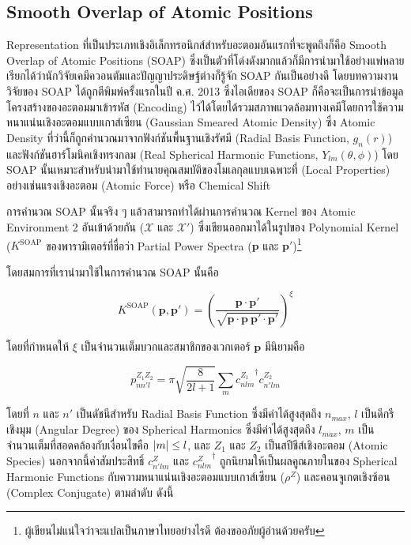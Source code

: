 \subsection{Smooth Overlap of Atomic Positions}
\label{ssec:soap}

Representation ที่เป็นประเภทเชิงอิเล็กทรอนิกส์สำหรับอะตอมอันแรกที่จะพูดถึงก็คือ Smooth Overlap of Atomic Positions (SOAP) 
ซึ่งเป็นตัวที่โด่งดังมากแล้วก็มีการนำมาใช้อย่างแพ่หลาย เรียกได้ว่านักวิจัยเคมีควอนตัมและปัญญาประดิษฐ์ต่างก็รู้จัก SOAP กันเป็นอย่างดี
โดยบทความงานวิจัยของ SOAP ได้ถูกตีพิมพ์ครั้งแรกในปี ค.ศ. 2013 ซึ่งไอเดียของ SOAP ก็คือจะเป็นการนำข้อมูลโครงสร้างของอะตอมมาเข้ารหัส 
(Encoding) ไว้ได้โดยได้รวมสภาพแวดล้อมทางเคมีโดยการใช้ความหนาแน่นเชิงอะตอมแบบเกาส์เซียน (Gaussian Smeared Atomic Density) 
ซึ่ง Atomic Density ที่ว่านี้ก็ถูกคำนวณมาจากฟังก์ชันพื้นฐานเชิงรัศมี (Radial Basis Function, $g_{n}(r)$) และฟังก์ชันฮาร์โมนิคเชิงทรงกลม 
(Real Spherical Harmonic Functions, $Y_{lm}(\theta, \phi)$)\autocite{bartok2013,de2016}
โดย SOAP นั้นเหมาะสำหรับนำมาใช้ทำนายคุณสมบัติของโมเลกุลแบบเฉพาะที่ (Local Properties) อย่างเช่นแรงเชิงอะตอม (Atomic Force) 
หรือ Chemical Shift

การคำนวณ SOAP นั้นจริง ๆ แล้วสามารถทำได้ผ่านการคำนวณ Kernel ของ Atomic Environment 2 อันเข้าด้วยกัน ($\mathcal{X}$ และ 
$\mathcal{X}'$) ซึ่งเขียนออกมาได้ในรูปของ Polynomial Kernel ($K^\mathrm{SOAP}$ ของพารามิเตอร์ที่ชื่อว่า Partial Power 
Spectra ($\mathbf{p}$ และ $\mathbf{p}'$)\footnote{ผู้เขียนไม่แน่ใจว่าจะแปลเป็นภาษาไทยอย่างไรดี ต้องขออภัยผู้อ่านด้วยครับ} 

โดยสมการที่เรานำมาใช้ในการคำนวณ SOAP นั้นคือ

\begin{equation}\label{eq:soap}
    K^\mathrm{SOAP}(\mathbf{p}, \mathbf{p'}) = \left( \frac{\mathbf{p} \cdot \mathbf{p'}}{\sqrt{\mathbf{p} 
    \cdot \mathbf{p}~\mathbf{p'} \cdot \mathbf{p'}}}\right)^{\xi}
\end{equation}

\noindent โดยที่กำหนดให้ $\xi$ เป็นจำนวนเต็มบวกและสมาชิกของเวกเตอร์ $\mathbf{p}$ มีนิยามคือ 

\begin{equation}\label{eq:soap_power_spec}
    p^{Z_1 Z_2}_{n n' l} = \pi \sqrt{\frac{8}{2l+1}}\sum_m {c^{Z_1}_{n l m}}^{\dagger} c^{Z_2}_{n' l m}
\end{equation}

\noindent โดยที่ $n$ และ $n'$ เป็นดัชนีสำหรับ Radial Basis Function ซึ่งมีค่าได้สูงสุดถึง $n_{max}$, $l$ เป็นดีกรีเชิงมุม 
(Angular Degree) ของ Spherical Harmonics ซึ่งมีค่าได้สูงสุดถึง $l_{max}$, $m$ เป็นจำนวนเต็มที่สอดคล้องกับเงื่อนไขคือ $\abs{m} 
\leq l$, และ $Z_{1}$ และ $Z_{2}$ เป็นสปีชีส์เชิงอะตอม (Atomic Species) นอกจากนี้ค่าสัมประสิทธิ์ $c^{Z}_{n'lm}$ และ 
${c^{Z}_{nlm}}^{\dagger}$ ถูกนิยามให้เป็นผลคูณภายในของ Spherical Harmonic Functions กับความหนาแน่นเชิงอะตอมแบบเกาส์เซียน 
($\rho^Z$) และคอนจูเกตเชิงซ้อน (Complex Conjugate) ตามลำดับ\autocite{de2016} ดังนี้


